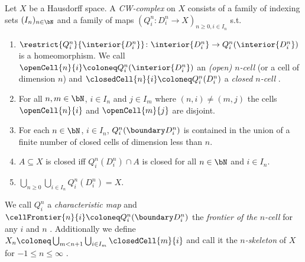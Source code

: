\begin{defi}\label{defi:CWComplex2}
    Let $X$ be a Hausdorff space.
    A \emph{CW-complex} on $X$ consists of a family of indexing sets $(I_n)_{n \in \bN}$ and a family of maps $(Q_i^n\colon D_i^n\rightarrow X)_{n \ge 0, i \in I_n}$ s.t.
    \begin{enumerate}
        \item $\restrict{Q_i^n}{\interior{D_i^n}}\colon \interior{D_i^n} \rightarrow Q_i^n(\interior{D_i^n})$ is a homeomorphism. We call $\openCell{n}{i} \coloneq Q_i^n(\interior{D_i^n})$ an \emph{(open) $n$-cell} (or a cell of dimension $n$)
        \href{https://github.com/scholzhannah/CWComplexes/blob/7be4872a05b534011cc969eb5b80a4b7f0bf57e2/CWcomplexes/Definition.lean#L84-L86}{\faExternalLink}
        and $\closedCell{n}{i} \coloneq Q_i^n(D_i^n)$ a \emph{closed $n$-cell}
        \href{https://github.com/scholzhannah/CWComplexes/blob/7be4872a05b534011cc969eb5b80a4b7f0bf57e2/CWcomplexes/Definition.lean#L88-L90}{\faExternalLink}
        .
        \item For all $n, m \in \bN$, $i \in I_n$ and $j \in I_m$ where $(n, i) \ne (m, j)$ the cells $\openCell{n}{i}$ and $\openCell{m}{j}$ are disjoint.
        \item For each $n \in \bN$, $i \in I_n$, $Q_i^n(\boundary D_i^n)$ is contained in the union of a finite number of closed cells of dimension less than $n$.
        \item $A \subseteq X$ is closed iff $Q_i^n(D_i^n) \cap A$ is closed for all $n \in \bN$ and $i \in I_n$.
        \item $\bigcup_{n \ge 0}\bigcup_{i \in I_n} Q_i^n(D_i^n) = X$.
    \end{enumerate}
    We call $Q_i^n$ a \emph{characteristic map} and $\cellFrontier{n}{i} \coloneq Q_i^n(\boundary D_i^n)$ the \emph{frontier of the $n$-cell} for any $i$ and $n$ 
    \href{https://github.com/scholzhannah/CWComplexes/blob/7be4872a05b534011cc969eb5b80a4b7f0bf57e2/CWcomplexes/Definition.lean#L92-L94}{\faExternalLink}
    .
    Additionally we define $X_n \coloneq \bigcup_{m < n + 1} \bigcup_{i \in I_m} \closedCell{m}{i}$ and call it the \emph{$n$-skeleton} of $X$ for $-1 \le n \le \infty$
    \href{https://github.com/scholzhannah/CWComplexes/blob/7be4872a05b534011cc969eb5b80a4b7f0bf57e2/CWcomplexes/Definition.lean#L143-L146}{\faExternalLink}
    . 
    \href{https://github.com/scholzhannah/CWComplexes/blob/7be4872a05b534011cc969eb5b80a4b7f0bf57e2/CWcomplexes/Definition.lean#L47-L76}{\faExternalLink}
\end{defi}

